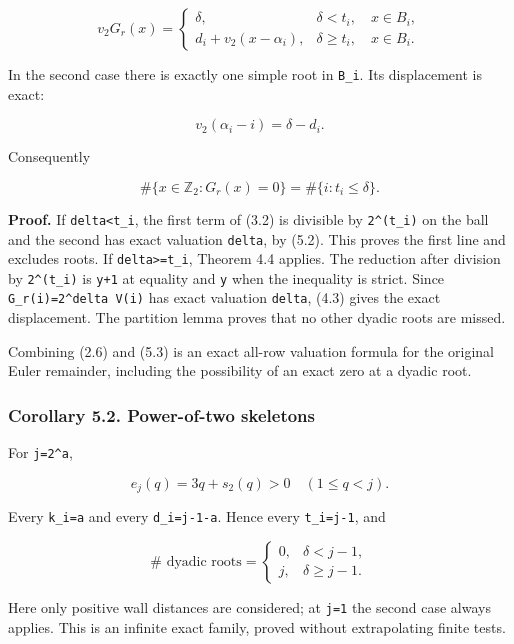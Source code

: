 \documentclass[11pt,letterpaper]{article}
\begin{document}
\[
\boxed{v_2G_r(x)=
\begin{cases}
\delta,&\delta<t_i,\quad x\in B_i,\\
d_i+v_2(x-\alpha_i),&\delta\ge t_i,\quad x\in B_i.
\end{cases}} \tag{5.3}
\]

In the second case there is exactly one simple root in \texttt{B\_i}. Its displacement is exact:

\[
v_2(\alpha_i-i)=\delta-d_i.
\]

Consequently

\[
\boxed{\#\{x\in\mathbb Z_2:G_r(x)=0\}=\#\{i:t_i\le\delta\}.} \tag{5.4}
\]

\textbf{Proof.} If \texttt{delta\textless{}t\_i}, the first term of (3.2) is divisible by \texttt{2\^{}(t\_i)} on the ball and the second has exact valuation \texttt{delta}, by (5.2). This proves the first line and excludes roots. If \texttt{delta\textgreater{}=t\_i}, Theorem 4.4 applies. The reduction after division by \texttt{2\^{}(t\_i)} is \texttt{y+1} at equality and \texttt{y} when the inequality is strict. Since \texttt{G\_r(i)=2\^{}delta\ V(i)} has exact valuation \texttt{delta}, (4.3) gives the exact displacement. The partition lemma proves that no other dyadic roots are missed.

Combining (2.6) and (5.3) is an exact all-row valuation formula for the original Euler remainder, including the possibility of an exact zero at a dyadic root.

\subsubsection{Corollary 5.2. Power-of-two skeletons}\label{corollary-5.2.-power-of-two-skeletons}

For \texttt{j=2\^{}a},

\[
e_j(q)=3q+s_2(q)>0\quad(1\le q<j).
\]

Every \texttt{k\_i=a} and every \texttt{d\_i=j-1-a}. Hence every \texttt{t\_i=j-1}, and

\[
\boxed{\#\text{ dyadic roots}=
\begin{cases}
0,&\delta<j-1,\\
j,&\delta\ge j-1.
\end{cases}} \tag{5.5}
\]

Here only positive wall distances are considered; at \texttt{j=1} the second case always applies. This is an infinite exact family, proved without extrapolating finite tests.
\end{document}
